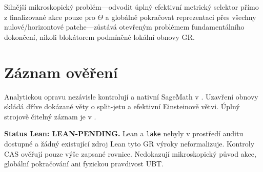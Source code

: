 \documentclass[11pt,a4paper]{article}
\begin{document}
Silnější mikroskopický problém---odvodit úplný efektivní metrický selektor
přímo z finalizované akce pouze pro $\Theta$ a globálně pokračovat reprezentaci
přes všechny nulové/horizontové patche---zůstává otevřeným problémem
fundamentálního dokončení, nikoli blokátorem podmíněné lokální obnovy GR.

\section{Záznam ověření}
Analytickou opravu nezávisle kontrolují
 a nativní SageMath v
. Uzavření obnovy skládá dříve dokázané věty
o split-jetu a efektivní Einsteinově větvi. Úplný strojově čitelný záznam je v
.

\textbf{Status Lean: LEAN-PENDING.} Lean a \texttt{lake} nebyly v prostředí
auditu dostupné a žádný existující zdroj Lean tyto GR výroky neformalizuje.
Kontroly CAS ověřují pouze výše zapsané rovnice. Nedokazují mikroskopický původ
akce, globální pokračování ani fyzickou pravdivost UBT.
\end{document}
